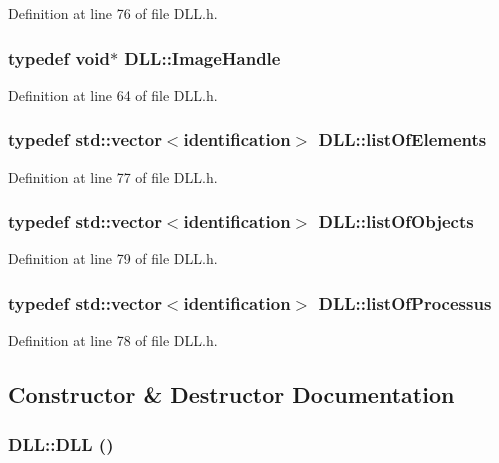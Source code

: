 Definition at line 76 of file DLL.h.\hypertarget{classDLL_addaefe5c907a5f357cc18718300f22b0}{
\subsubsection[{ImageHandle}]{\setlength{\rightskip}{0pt plus 5cm}typedef void$\ast$ {\bf DLL::ImageHandle}}}
\label{classDLL_addaefe5c907a5f357cc18718300f22b0}


Definition at line 64 of file DLL.h.\hypertarget{classDLL_a36792635c3cd36adbaaef2ff7152046e}{
\subsubsection[{listOfElements}]{\setlength{\rightskip}{0pt plus 5cm}typedef std::vector$<${\bf identification}$>$ {\bf DLL::listOfElements}}}
\label{classDLL_a36792635c3cd36adbaaef2ff7152046e}


Definition at line 77 of file DLL.h.\hypertarget{classDLL_a68629aa6f9103c5a3082511ff8218b1e}{
\subsubsection[{listOfObjects}]{\setlength{\rightskip}{0pt plus 5cm}typedef std::vector$<${\bf identification}$>$ {\bf DLL::listOfObjects}}}
\label{classDLL_a68629aa6f9103c5a3082511ff8218b1e}


Definition at line 79 of file DLL.h.\hypertarget{classDLL_aded1b0bb41b288ed4f34cb6d6632d486}{
\subsubsection[{listOfProcessus}]{\setlength{\rightskip}{0pt plus 5cm}typedef std::vector$<${\bf identification}$>$ {\bf DLL::listOfProcessus}}}
\label{classDLL_aded1b0bb41b288ed4f34cb6d6632d486}


Definition at line 78 of file DLL.h.

\subsection{Constructor \& Destructor Documentation}
\hypertarget{classDLL_a78a22a98025697c4862ffc2a7cfcb648}{
\subsubsection[{DLL}]{\setlength{\rightskip}{0pt plus 5cm}DLL::DLL ()}}
\label{classDLL_a78a22a98025697c4862ffc2a7cfcb648}


